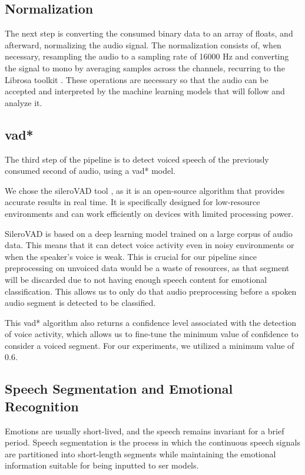 \subsection{Normalization}

The next step is converting the consumed binary data to an array of floats, and afterward, normalizing the audio signal. The normalization consists of, when necessary, resampling the audio to a sampling rate of 16000 Hz and converting the signal to mono by averaging samples across the channels, recurring to the Librosa toolkit \cite{Librosa}. These operations are necessary so that the audio can be accepted and interpreted by the machine learning models that will follow and analyze it.

\subsection{\acl{vad*}}

The third step of the pipeline is to detect voiced speech of the previously consumed second of audio, using a \ac{vad*} model.

We chose the sileroVAD tool \cite{SileroVAD}, as it is an open-source algorithm that provides accurate results in real time. It is specifically designed for low-resource environments and can work efficiently on devices with limited processing power.

SileroVAD is based on a deep learning model trained on a large corpus of audio data. This means that it can detect voice activity even in noisy environments or when the speaker's voice is weak. This is crucial for our pipeline since preprocessing on unvoiced data would be a waste of resources, as that segment will be discarded due to not having enough speech content for emotional classification. This allows us to only do that audio preprocessing before a spoken audio segment is detected to be classified.

This \ac{vad*} algorithm also returns a confidence level associated with the detection of voice activity, which allows us to fine-tune the minimum value of confidence to consider a voiced segment. For our experiments, we utilized a minimum value of 0.6.

\subsection{Speech Segmentation and Emotional Recognition}

Emotions are usually short-lived, and the speech remains invariant for a brief period. Speech segmentation is the process in which the continuous speech signals are partitioned into short-length segments while maintaining the emotional information suitable for being inputted to \ac{ser} models.

